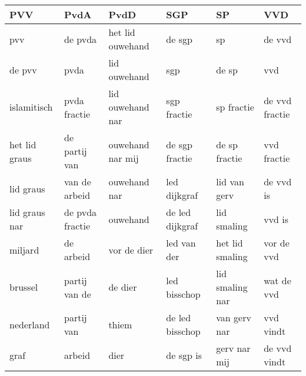 \begin{tabular}{llllll}
\toprule
           PVV &             PvdA &              PvdD &              SGP &               SP &             VVD \\
\midrule
           pvv &          de pvda &  het lid ouwehand &           de sgp &               sp &          de vvd \\
        de pvv &             pvda &      lid ouwehand &              sgp &            de sp &             vvd \\
   islamitisch &     pvda fractie &  lid ouwehand nar &      sgp fractie &       sp fractie &  de vvd fractie \\
 het lid graus &    de partij van &  ouwehand nar mij &   de sgp fractie &    de sp fractie &     vvd fractie \\
     lid graus &    van de arbeid &      ouwehand nar &     led dijkgraf &     lid van gerv &       de vvd is \\
 lid graus nar &  de pvda fractie &          ouwehand &  de led dijkgraf &      lid smaling &          vvd is \\
       miljard &        de arbeid &       vor de dier &      led van der &  het lid smaling &      vor de vvd \\
       brussel &    partij van de &           de dier &     led bisschop &  lid smaling nar &      wat de vvd \\
     nederland &       partij van &             thiem &  de led bisschop &     van gerv nar &       vvd vindt \\
          graf &           arbeid &              dier &        de sgp is &     gerv nar mij &    de vvd vindt \\
\bottomrule
\end{tabular}
